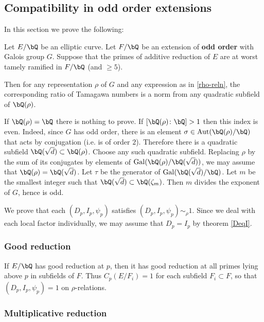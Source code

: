 \subsection{Compatibility in odd order extensions}

In this section we prove the following:

\begin{thm}
    Let $E / \bQ$ be an elliptic curve. Let $F / \bQ$ be an extension of \textbf{odd order} with Galois group $G$. Suppose that the primes of additive reduction of $E$ are at worst tamely ramified in $F / \bQ$ (and $\geq 5$). 
    
    Then for any representation $\rho$ of $G$ and any expression as in \ref{rho-reln}, the corresponding ratio of Tamagawa numbers is a norm from any quadratic subfield of $\bQ(\rho)$.
\end{thm}

If $\bQ(\rho) = \bQ$ there is nothing to prove. 
If $[\bQ(\rho) \colon \bQ] > 1$ then this index is even. Indeed, since $G$ has odd order, there is an element $\sigma \in \Aut(\bQ(\rho) / \bQ)$ that acts by conjugation (i.e. is of order $2$). Therefore there is a quadratic subfield $\bQ(\sqrt{d}) \subset \bQ(\rho)$. Choose any such quadratic subfield. Replacing $\rho$ by the sum of its conjugates by elements of $ \Gal(\bQ(\rho) / \bQ(\sqrt{d}))$, we may assume that $\bQ(\rho) = \bQ(\sqrt{d})$. Let $\tau$ be the generator of $\Gal(\bQ(\sqrt{d}) / \bQ)$. Let $m$ be the smallest integer such that $\bQ(\sqrt{d}) \subset \bQ(\zeta_m)$. Then $m$ divides the exponent of $G$, hence is odd.

We prove that each $(D_p, I_p, \psi_p)$  satisfies $(D_p, I_p, \psi_p) \sim_{\rho} 1$. Since we deal with each local factor individually, we may assume that $D_p = I_p$ by theorem \ref{DeqI}.

\subsubsection*{Good reduction}
If $E / \bQ$ has good reduction at $p$, then it has good reduction at all primes lying above $p$ in subfields of $F$. Thus $C_p(E / F_i) = 1$ for each subfield $F_i \subset F$, so that $(D_p, I_p, \psi_p) = 1$ on $\rho$-relations. 

\subsubsection*{Multiplicative reduction}

